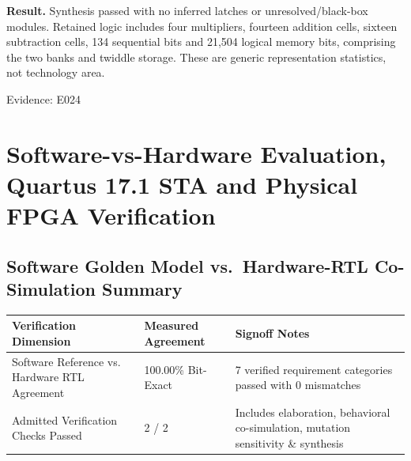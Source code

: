 \documentclass[11pt,a4paper]{article}
\begin{document}
\textbf{Result.} Synthesis passed with no inferred latches or unresolved/\allowbreak{}black-box modules. Retained logic includes four multipliers,\allowbreak{} fourteen addition cells,\allowbreak{} sixteen subtraction cells,\allowbreak{} 134 sequential bits and 21,\allowbreak{}504 logical memory bits,\allowbreak{} comprising the two banks and twiddle storage. These are generic representation statistics,\allowbreak{} not technology area.

{\small Evidence: E024}

\section{Software-vs-Hardware Evaluation, Quartus 17.1 STA and Physical FPGA Verification}

\subsection{Software Golden Model vs.\ Hardware-RTL Co-Simulation Summary}

{\small\renewcommand{\arraystretch}{1.18}\begin{longtable}{@{}L{0.38\textwidth}L{0.22\textwidth}L{0.32\textwidth}@{}}\toprule

\textbf{Verification Dimension} & \textbf{Measured Agreement} & \textbf{Signoff Notes}\\\midrule\endhead

Software Reference vs. Hardware RTL Agreement & 100.00\% Bit-Exact & 7 verified requirement categories passed with 0 mismatches\\[3pt]

Admitted Verification Checks Passed & 2 /\allowbreak{} 2 & Includes elaboration,\allowbreak{} behavioral co-simulation,\allowbreak{} mutation sensitivity \& synthesis\\[3pt]

\bottomrule\end{longtable}}
\end{document}
